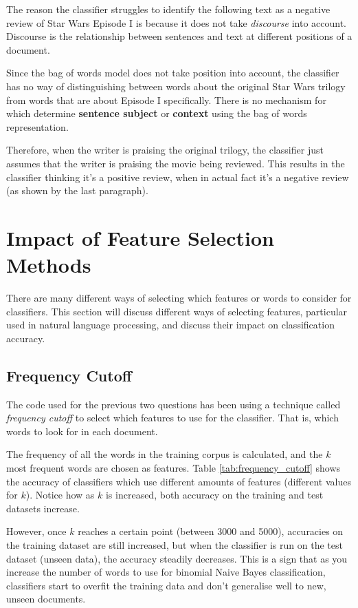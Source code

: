 \documentclass{article}
\begin{document}
The reason the classifier struggles to identify the following text as a negative review of Star Wars Episode I is because it does not take \textit{discourse} into account. Discourse is the relationship between sentences and text at different positions of a document.

Since the bag of words model does not take position into account, the classifier has no way of distinguishing between words about the original Star Wars trilogy from words that are about Episode I specifically. There is no mechanism for which determine \textbf{sentence subject} or \textbf{context} using the bag of words representation.

Therefore, when the writer is praising the original trilogy, the classifier just assumes that the writer is praising the movie being reviewed. This results in the classifier thinking it's a positive review, when in actual fact it's a negative review (as shown by the last paragraph).

\section{Impact of Feature Selection Methods}

There are many different ways of selecting which features or words to consider for classifiers. This section will discuss different ways of selecting features, particular used in natural language processing, and discuss their impact on classification accuracy.

\subsection{Frequency Cutoff}

The code used for the previous two questions has been using a technique called \textit{frequency cutoff} to select which features to use for the classifier. That is, which words to look for in each document.

The frequency of all the words in the training corpus is calculated, and the $k$ most frequent words are chosen as features. Table \ref{tab:frequency_cutoff} shows the accuracy of classifiers which use different amounts of features (different values for $k$). Notice how as $k$ is increased, both accuracy on the training and test datasets increase.

However, once $k$ reaches a certain point (between 3000 and 5000),  accuracies on the training dataset are still increased, but when the classifier is run on the test dataset (unseen data), the accuracy steadily decreases. This is a sign that as you increase the number of words to use for binomial Naive Bayes classification, classifiers start to overfit the training data and don't generalise well to new, unseen documents.
\end{document}

